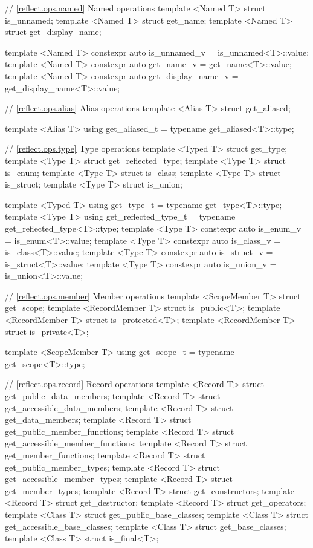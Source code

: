 \begin{std.txt}
\begin{codeblock}
{{// \ref{reflect.ops.named} Named operations
template <Named T> struct is_unnamed;
template <Named T> struct get_name;
template <Named T> struct get_display_name;

template <Named T>
  constexpr auto is_unnamed_v = is_unnamed<T>::value;
template <Named T>
  constexpr auto get_name_v = get_name<T>::value;
template <Named T>
  constexpr auto get_display_name_v = get_display_name<T>::value;

// \ref{reflect.ops.alias} Alias operations
template <Alias T> struct get_aliased;

template <Alias T>
  using get_aliased_t = typename get_aliased<T>::type;

// \ref{reflect.ops.type} Type operations
template <Typed T> struct get_type;
template <Type T> struct get_reflected_type;
template <Type T> struct is_enum;
template <Type T> struct is_class;
template <Type T> struct is_struct;
template <Type T> struct is_union;

template <Typed T>
  using get_type_t = typename get_type<T>::type;
template <Type T>
  using get_reflected_type_t = typename get_reflected_type<T>::type;
template <Type T>
  constexpr auto is_enum_v = is_enum<T>::value;
template <Type T>
  constexpr auto is_class_v = is_class<T>::value;
template <Type T>
  constexpr auto is_struct_v = is_struct<T>::value;
template <Type T>
  constexpr auto is_union_v = is_union<T>::value;

// \ref{reflect.ops.member} Member operations
template <ScopeMember T> struct get_scope;
template <RecordMember T> struct is_public<T>;
template <RecordMember T> struct is_protected<T>;
template <RecordMember T> struct is_private<T>;

template <ScopeMember T>
  using get_scope_t = typename get_scope<T>::type;

// \ref{reflect.ops.record} Record operations
template <Record T> struct get_public_data_members;
template <Record T> struct get_accessible_data_members;
template <Record T> struct get_data_members;
template <Record T> struct get_public_member_functions;
template <Record T> struct get_accessible_member_functions;
template <Record T> struct get_member_functions;
template <Record T> struct get_public_member_types;
template <Record T> struct get_accessible_member_types;
template <Record T> struct get_member_types;
template <Record T> struct get_constructors;
template <Record T> struct get_destructor;
template <Record T> struct get_operators;
template <Class T> struct get_public_base_classes;
template <Class T> struct get_accessible_base_classes;
template <Class T> struct get_base_classes;
template <Class T> struct is_final<T>;

}}
\end{codeblock}
\end{std.txt}
